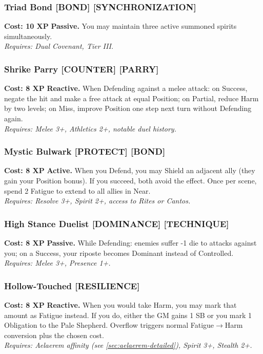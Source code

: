 \subsubsection*{Triad Bond \textnormal{[BOND] [SYNCHRONIZATION]}}
\label{talent:triad-bond}
\textbf{Cost: 10 XP} \textbf{Passive.} You may maintain three active summoned spirits simultaneously. \\
\textit{Requires: Dual Covenant, Tier III.}

\subsubsection*{Shrike Parry \textnormal{[COUNTER] [PARRY]}}
\label{talent:shrike-parry}
\textbf{Cost: 8 XP} \textbf{Reactive.} When Defending against a melee attack: on Success, negate the hit and make a free attack at equal Position; on Partial, reduce Harm by two levels; on Miss, improve Position one step next turn without Defending again. \\
\textit{Requires: Melee 3+, Athletics 2+, notable duel history.}

\subsubsection*{Mystic Bulwark \textnormal{[PROTECT] [BOND]}}
\label{talent:mystic-bulwark}
\textbf{Cost: 8 XP} \textbf{Active.} When you Defend, you may Shield an adjacent ally (they gain your Position bonus). If you succeed, both avoid the effect. Once per scene, spend 2 Fatigue to extend to all allies in Near. \\
\textit{Requires: Resolve 3+, Spirit 2+, access to Rites or Cantos.}

\subsubsection*{High Stance Duelist \textnormal{[DOMINANCE] [TECHNIQUE]}}
\label{talent:high-stance-duelist}
\textbf{Cost: 8 XP} \textbf{Passive.} While Defending: enemies suffer -1 die to attacks against you; on a Success, your riposte becomes Dominant instead of Controlled. \\
\textit{Requires: Melee 3+, Presence 1+.}

\subsubsection*{Hollow-Touched \textnormal{[RESILIENCE]}}
\label{talent:hollow-touched}
\textbf{Cost: 8 XP} \textbf{Reactive.} When you would take Harm, you may mark that amount as Fatigue instead. If you do, either the GM gains 1 SB or you mark 1 Obligation to the Pale Shepherd. Overflow triggers normal Fatigue$\rightarrow$Harm conversion plus the chosen cost. \\
\textit{Requires: Aelaerem affinity (see \ref{sec:aelaerem-detailed}), Spirit 3+, Stealth 2+.}

